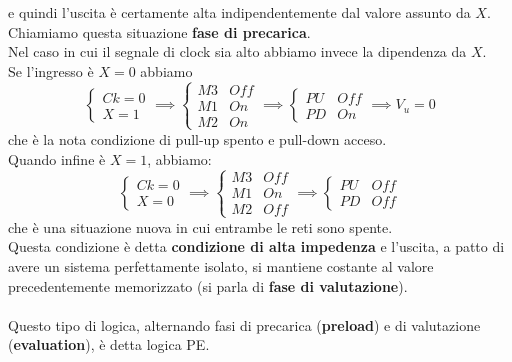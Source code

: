 \documentclass[../main.tex]{subfiles}
\begin{document}
	e quindi l'uscita è certamente alta indipendentemente dal valore assunto da $X$.\\
	Chiamiamo questa situazione \textbf{fase di precarica}.\\
	Nel caso in cui il segnale di clock sia alto abbiamo invece la dipendenza da $X$.\\
	Se l'ingresso è $X = 0$ abbiamo
	$$\begin{cases} Ck = 0 \\ X = 1 \end{cases} \implies \begin{cases} M3 & Off \\ M1 & On \\ M2 & On \end{cases} \implies \begin{cases} PU & Off \\ PD & On \end{cases} \implies V_u = 0$$
	che è la nota condizione di pull-up spento e pull-down acceso.\\
	Quando infine è $X = 1$, abbiamo:
	$$\begin{cases} Ck = 0 \\ X = 0 \end{cases} \implies \begin{cases} M3 & Off \\ M1 & On \\ M2 & Off \end{cases} \implies \begin{cases} PU & Off \\ PD & Off \end{cases}$$
	che è una situazione nuova in cui entrambe le reti sono spente.\\
	Questa condizione è detta \textbf{condizione di alta impedenza} e l'uscita, a patto di avere un sistema perfettamente isolato, si mantiene costante al valore precedentemente memorizzato (si parla di \textbf{fase di valutazione}).\\\\
	Questo tipo di logica, alternando fasi di precarica (\textbf{preload}) e di valutazione (\textbf{evaluation}), è detta logica PE.
\end{document}
